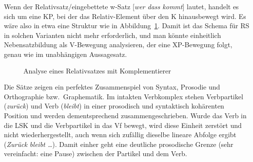 
Wenn der Relativsatz\slash eingebettete w-Satz [\textit{wer dass kommt}] lautet, handelt es sich um eine KP, bei der das Relativ-Element über den K hinausbewegt wird.
Es wäre also in etwa eine Struktur wie in Abbildung~\ref{fig:relativsatzzmitkomp}.
Damit ist das Schema für RS in solchen Varianten nicht mehr erforderlich, und man könnte einheitlich Nebensatzbildung als V-Bewegung analysieren, der eine XP-Bewegung folgt, genau wie im unabhängigen Aussagesatz.

\begin{figure}[!htbp]
  \begin{center}
  \end{center}
  \caption{Analyse eines Relativsatzes mit Komplementierer}
  \label{fig:relativsatzzmitkomp}
\end{figure}


Die Sätze zeigen ein perfektes Zusammenspiel von Syntax, Prosodie und Orthographie bzw.\ Graphematik.
Im intakten Verbkomplex stehen Verbpartikel (\textit{zurück}) und Verb (\textit{bleibt}) in einer prosodisch und syntaktisch kohärenten Position und werden dementsprechend zusammengeschrieben.
Wurde das Verb in die LSK und die Verbpartikel in das Vf bewegt, wird diese Einheit zerstört und nicht wiederhergestellt, auch wenn sich zufällig dieselbe lineare Abfolge ergibt (\textit{Zurück bleibt \ldots}).
Damit einher geht eine deutliche prosodische Grenze (sehr vereinfacht: eine Pause) zwischen der Partikel und dem Verb.



